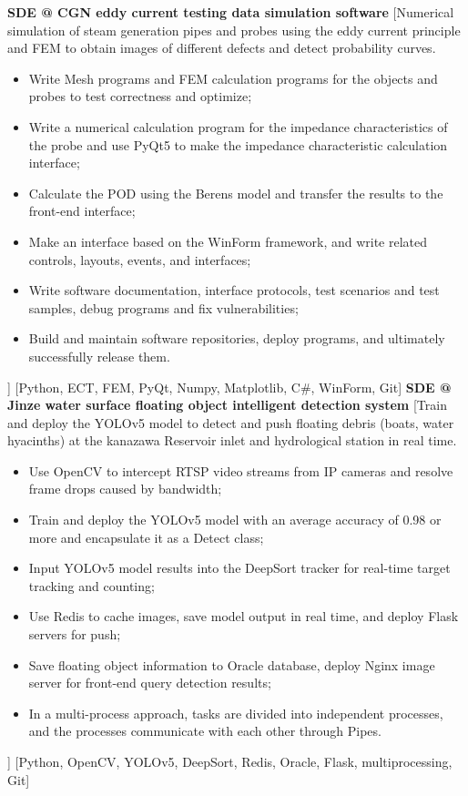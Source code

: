 \else
{}
\begin{experiences}
    {\textbf{SDE @ CGN eddy current testing data simulation software}}%
    [Numerical simulation of steam generation pipes and probes using the eddy current principle and FEM to obtain images of different defects and detect probability curves.
    \begin{itemize}
        \item {Write Mesh programs and FEM calculation programs for the objects and probes to test correctness and optimize;}
        \item {Write a numerical calculation program for the impedance characteristics of the probe and use PyQt5 to make the impedance characteristic calculation interface;}
        \item {Calculate the POD using the Berens model and transfer the results to the front-end interface;}
        \item {Make an interface based on the WinForm framework, and write related controls, layouts, events, and interfaces;}
        \item {Write software documentation, interface protocols, test scenarios and test samples, debug programs and fix vulnerabilities;}
        \item {Build and maintain software repositories, deploy programs, and ultimately successfully release them.}
    \end{itemize}]
    [Python, ECT, FEM, PyQt, Numpy, Matplotlib, C\#, WinForm, Git]
    \separator{0.5ex}
    {\textbf{SDE @ Jinze water surface floating object intelligent detection system}}%
    [Train and deploy the YOLOv5 model to detect and push floating debris (boats, water hyacinths) at the kanazawa Reservoir inlet and hydrological station in real time.
    \begin{itemize}
        \item {Use OpenCV to intercept RTSP video streams from IP cameras and resolve frame drops caused by bandwidth;}
        \item {Train and deploy the YOLOv5 model with an average accuracy of 0.98 or more and encapsulate it as a Detect class;}
        \item {Input YOLOv5 model results into the DeepSort tracker for real-time target tracking and counting;}
        \item {Use Redis to cache images, save model output in real time, and deploy Flask servers for push;}
        \item {Save floating object information to Oracle database, deploy Nginx image server for front-end query detection results;}
        \item {In a multi-process approach, tasks are divided into independent processes, and the processes communicate with each other through Pipes.}
    \end{itemize}]
    [Python, OpenCV, YOLOv5, DeepSort, Redis, Oracle, Flask, multiprocessing, Git]
\end{experiences}
\fi